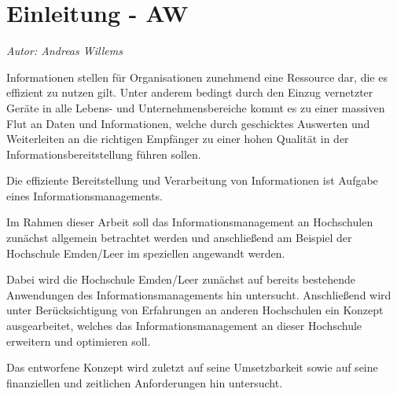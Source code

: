 \chapter{Einleitung - AW}
\textit{Autor: Andreas Willems}

Informationen stellen für Organisationen zunehmend eine Ressource dar, die es effizient zu nutzen gilt.
Unter anderem bedingt durch den Einzug vernetzter Geräte in alle Lebens- und Unternehmensbereiche 
kommt es zu einer massiven Flut an Daten und Informationen, welche durch geschicktes Auswerten und 
Weiterleiten an die richtigen Empfänger zu einer hohen Qualität in der Informationsbereitstellung 
führen sollen.

Die effiziente Bereitstellung und Verarbeitung von Informationen ist Aufgabe eines Informationsmanagements.

Im Rahmen dieser Arbeit soll das Informationsmanagement an Hochschulen zunächst allgemein betrachtet 
werden und anschließend am Beispiel der Hochschule Emden/Leer im speziellen angewandt werden.

Dabei wird die Hochschule Emden/Leer zunächst auf bereits bestehende Anwendungen des 
Informationsmanagements hin untersucht. Anschließend wird unter Berücksichtigung von 
Erfahrungen an anderen Hochschulen ein Konzept ausgearbeitet,
welches das Informationsmanagement an dieser Hochschule erweitern und optimieren soll.

Das entworfene Konzept wird zuletzt auf seine Umsetzbarkeit sowie auf seine finanziellen und 
zeitlichen Anforderungen hin untersucht.

